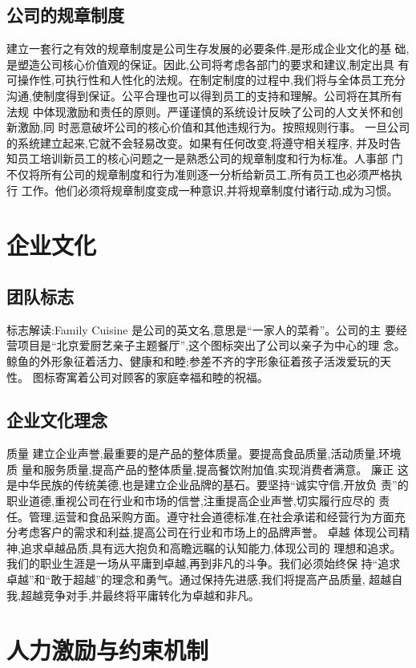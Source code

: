 \subsection{公司的规章制度}
建立一套行之有效的规章制度是公司生存发展的必要条件,是形成企业文化的基
础,是塑造公司核心价值观的保证。因此,公司将考虑各部门的要求和建议,制定出具
有可操作性,可执行性和人性化的法规。在制定制度的过程中,我们将与全体员工充分
沟通,使制度得到保证。公平合理也可以得到员工的支持和理解。公司将在其所有法规
中体现激励和责任的原则。严谨谨慎的系统设计反映了公司的人文关怀和创新激励,同
时恶意破坏公司的核心价值和其他违规行为。按照规则行事。
一旦公司的系统建立起来,它就不会轻易改变。如果有任何改变,将遵守相关程序,
并及时告知员工培训新员工的核心问题之一是熟悉公司的规章制度和行为标准。人事部
门不仅将所有公司的规章制度和行为准则逐一分析给新员工,所有员工也必须严格执行
工作。他们必须将规章制度变成一种意识,并将规章制度付诸行动,成为习惯。
\section{企业文化}
\subsection{团队标志}
标志解读:Family Cuisine 是公司的英文名,意思是“一家人的菜肴”。公司的主
要经营项目是“北京爱厨艺亲子主题餐厅”,这个图标突出了公司以亲子为中心的理
念。鲸鱼的外形象征着活力、健康和和睦;参差不齐的字形象征着孩子活泼爱玩的天性。
图标寄寓着公司对顾客的家庭幸福和睦的祝福。

\subsection{企业文化理念}
质量
建立企业声誉,最重要的是产品的整体质量。要提高食品质量,活动质量,环境质
量和服务质量,提高产品的整体质量,提高餐饮附加值,实现消费者满意。
廉正
这是中华民族的传统美德,也是建立企业品牌的基石。要坚持“诚实守信,开放负
责”的职业道德,重视公司在行业和市场的信誉,注重提高企业声誉,切实履行应尽的
责任。管理,运营和食品采购方面。遵守社会道德标准,在社会承诺和经营行为方面充
分考虑客户的需求和利益,提高公司在行业和市场上的品牌声誉。
卓越
体现公司精神,追求卓越品质,具有远大抱负和高瞻远瞩的认知能力,体现公司的
理想和追求。我们的职业生涯是一场从平庸到卓越,再到非凡的斗争。我们必须始终保
持“追求卓越”和“敢于超越”的理念和勇气。通过保持先进感,我们将提高产品质量,
超越自我,超越竞争对手,并最终将平庸转化为卓越和非凡。

\section{人力激励与约束机制}
